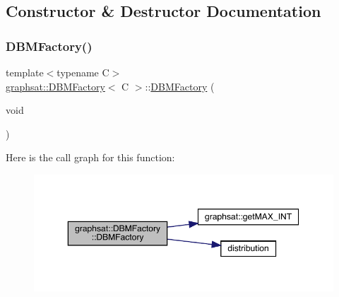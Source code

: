 \subsection{Constructor \& Destructor Documentation}
\mbox{\label{classgraphsat_1_1_d_b_m_factory_a9e1186bd6895316c221b836278ff8e67}} 
\subsubsection{\texorpdfstring{DBMFactory()}{DBMFactory()}\hspace{0.1cm}{\footnotesize\ttfamily [1/3]}}
{\footnotesize\ttfamily template$<$typename C$>$ \\
\mbox{\hyperlink{classgraphsat_1_1_d_b_m_factory}{graphsat\+::\+D\+B\+M\+Factory}}$<$ C $>$\+::\mbox{\hyperlink{classgraphsat_1_1_d_b_m_factory}{D\+B\+M\+Factory}} (\begin{DoxyParamCaption}\item[{void}]{ }\end{DoxyParamCaption})\hspace{0.3cm}{\ttfamily [inline]}}

Here is the call graph for this function\+:
\nopagebreak
\begin{figure}[H]
\begin{center}
\leavevmode
\includegraphics[width=350pt]{classgraphsat_1_1_d_b_m_factory_a9e1186bd6895316c221b836278ff8e67_cgraph}
\end{center}
\end{figure}
\mbox{\label{classgraphsat_1_1_d_b_m_factory_ad74660809aa5c24398bc51d4124bfc34}} 
